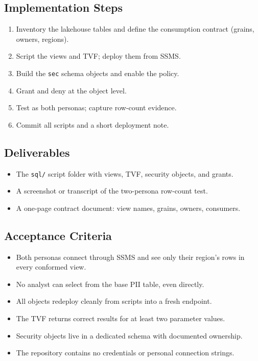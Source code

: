 \subsection*{Implementation Steps}
\begin{enumerate}
    \item Inventory the lakehouse tables and define the consumption contract (grains, owners, regions).
    \item Script the views and TVF; deploy them from SSMS.
    \item Build the \texttt{sec} schema objects and enable the policy.
    \item Grant and deny at the object level.
    \item Test as both personas; capture row-count evidence.
    \item Commit all scripts and a short deployment note.
\end{enumerate}

\subsection*{Deliverables}
\begin{itemize}
    \item The \texttt{sql/} script folder with views, TVF, security objects, and grants.
    \item A screenshot or transcript of the two-persona row-count test.
    \item A one-page contract document: view names, grains, owners, consumers.
\end{itemize}

\subsection*{Acceptance Criteria}
\begin{itemize}
    \item[\(\square\)] Both personas connect through SSMS and see only their region's rows in every conformed view.
    \item[\(\square\)] No analyst can select from the base PII table, even directly.
    \item[\(\square\)] All objects redeploy cleanly from scripts into a fresh endpoint.
    \item[\(\square\)] The TVF returns correct results for at least two parameter values.
    \item[\(\square\)] Security objects live in a dedicated schema with documented ownership.
    \item[\(\square\)] The repository contains no credentials or personal connection strings.
\end{itemize}

